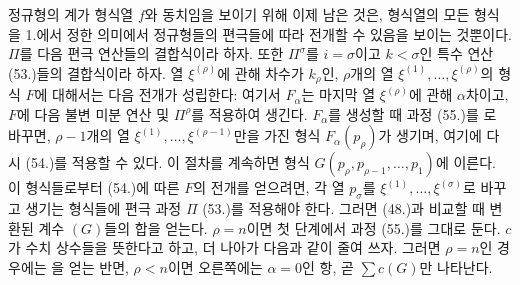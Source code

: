 정규형의 계가 형식열 $f$와 동치임을 보이기 위해 이제 남은 것은, 형식열의 모든 형식을 1.에서 정한 의미에서 정규형들의 편극들에 따라 전개할 수 있음을 보이는 것뿐이다. $\Pi$를 다음 편극 연산들의 결합식이라 하자.
또한 $\Pi^\sigma$를 $i=\sigma$이고 $k<\sigma$인 특수 연산 (53.)들의 결합식이라 하자. 열 $\xi^{(\rho)}$에 관해 차수가 $k_\rho$인, $\rho$개의 열 $\xi^{(1)},\ldots,\xi^{(\rho)}$의 형식 $F$에 대해서는 다음 전개가 성립한다:
여기서 $F_\alpha$는 마지막 열 $\xi^{(\rho)}$에 관해 $\alpha$차이고, $F$에 다음 불변 미분 연산
및 $\Pi^\rho$를 적용하여 생긴다. $F_\alpha$를 생성할 때 과정 (55.)를
로 바꾸면, $\rho-1$개의 열 $\xi^{(1)},\ldots,\xi^{(\rho-1)}$만을 가진 형식 $F_\alpha(p_\rho)$가 생기며, 여기에 다시 (54.)를 적용할 수 있다. 이 절차를 계속하면 형식 $G(p_\rho,p_{\rho-1},\ldots,p_1)$에 이른다. 이 형식들로부터 (54.)에 따른 $F$의 전개를 얻으려면, 각 열 $p_\sigma$를 $\xi^{(1)},\ldots,\xi^{(\sigma)}$로 바꾸고 생기는 형식들에 편극 과정 $\Pi$ (53.)를 적용해야 한다. 그러면 (48.)과 비교할 때 변환된 계수 $(G)$들의 합을 얻는다. $\rho=n$이면 첫 단계에서 과정 (55.)를 그대로 둔다. $c$가 수치 상수들을 뜻한다고 하고, 더 나아가 다음과 같이 줄여 쓰자.
그러면 $\rho=n$인 경우에는
을 얻는 반면, $\rho<n$이면 오른쪽에는 $\alpha=0$인 항, 곧 $\sum c(G)$만 나타난다.

